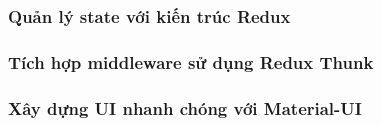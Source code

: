 \subsubsection{Quản lý state với kiến trúc Redux}

\subsubsection{Tích hợp middleware sử dụng Redux Thunk}

\subsubsection{Xây dựng UI nhanh chóng với Material-UI}

